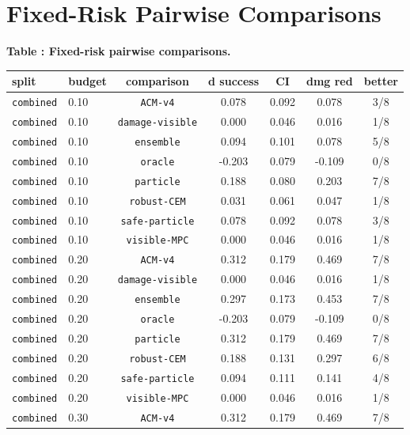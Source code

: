 \documentclass{article}
\begin{document}
\section{Fixed-Risk Pairwise Comparisons}
\scriptsize
\setlength{\tabcolsep}{2pt}
\begin{center}
\label{tab:fixed-pair}\textbf{Table \thetable: Fixed-risk pairwise comparisons.}\\[0.4ex]
\begin{tabular}{llccccc}
\toprule
split & budget & comparison & d success & CI & dmg red & better \\
\midrule
\texttt{combined} & 0.10 & \texttt{ACM-v4} & 0.078 & 0.092 & 0.078 & 3/8 \\
\texttt{combined} & 0.10 & \texttt{damage-visible} & 0.000 & 0.046 & 0.016 & 1/8 \\
\texttt{combined} & 0.10 & \texttt{ensemble} & 0.094 & 0.101 & 0.078 & 5/8 \\
\texttt{combined} & 0.10 & \texttt{oracle} & -0.203 & 0.079 & -0.109 & 0/8 \\
\texttt{combined} & 0.10 & \texttt{particle} & 0.188 & 0.080 & 0.203 & 7/8 \\
\texttt{combined} & 0.10 & \texttt{robust-CEM} & 0.031 & 0.061 & 0.047 & 1/8 \\
\texttt{combined} & 0.10 & \texttt{safe-particle} & 0.078 & 0.092 & 0.078 & 3/8 \\
\texttt{combined} & 0.10 & \texttt{visible-MPC} & 0.000 & 0.046 & 0.016 & 1/8 \\
\texttt{combined} & 0.20 & \texttt{ACM-v4} & 0.312 & 0.179 & 0.469 & 7/8 \\
\texttt{combined} & 0.20 & \texttt{damage-visible} & 0.000 & 0.046 & 0.016 & 1/8 \\
\texttt{combined} & 0.20 & \texttt{ensemble} & 0.297 & 0.173 & 0.453 & 7/8 \\
\texttt{combined} & 0.20 & \texttt{oracle} & -0.203 & 0.079 & -0.109 & 0/8 \\
\texttt{combined} & 0.20 & \texttt{particle} & 0.312 & 0.179 & 0.469 & 7/8 \\
\texttt{combined} & 0.20 & \texttt{robust-CEM} & 0.188 & 0.131 & 0.297 & 6/8 \\
\texttt{combined} & 0.20 & \texttt{safe-particle} & 0.094 & 0.111 & 0.141 & 4/8 \\
\texttt{combined} & 0.20 & \texttt{visible-MPC} & 0.000 & 0.046 & 0.016 & 1/8 \\
\texttt{combined} & 0.30 & \texttt{ACM-v4} & 0.312 & 0.179 & 0.469 & 7/8 \\

\end{tabular}
\end{center}
\end{document}
